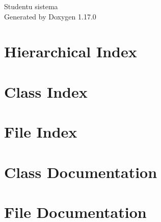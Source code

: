 \documentclass[twoside]{book}
\newcommand{\+}{\discretionary{\mbox{\scriptsize$\hookleftarrow$}}{}{}}
\newcommand{\clearemptydoublepage}{%
    \newpage{\pagestyle{empty}\cleardoublepage}%
  }
\begin{document}
  \raggedbottom
    \hypersetup{pageanchor=false,
                bookmarksnumbered=true,
                pdfencoding=unicode
               }
  \begin{titlepage}
  \vspace*{7cm}
  \begin{center}%
  {\Large Studentu sistema}\\
  \vspace*{1cm}
  {\large Generated by Doxygen 1.17.0}\\
  \end{center}
  \end{titlepage}
  \clearemptydoublepage
  \tableofcontents
  \clearemptydoublepage
  \hypersetup{pageanchor=true}

\chapter{Hierarchical Index}

\chapter{Class Index}

\chapter{File Index}

\chapter{Class Documentation}


\chapter{File Documentation}






  \backmatter
  \newpage
  \clearemptydoublepage
  \printindex
\end{document}
